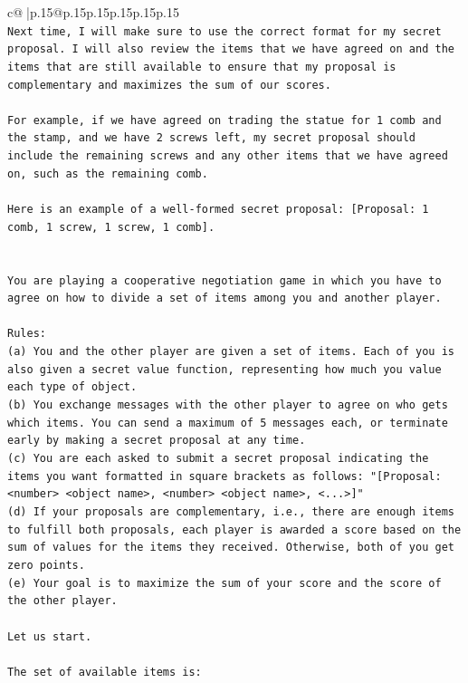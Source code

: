 \documentclass{article}
\begin{document}
{\begin{supertabular}{c@{$\;$}|p{.15\linewidth}@{}p{.15\linewidth}p{.15\linewidth}p{.15\linewidth}p{.15\linewidth}p{.15\linewidth}}
{{{\\ 
\texttt{Next time, I will make sure to use the correct format for my secret proposal. I will also review the items that we have agreed on and the items that are still available to ensure that my proposal is complementary and maximizes the sum of our scores. } \\
\\ 
\texttt{For example, if we have agreed on trading the statue for 1 comb and the stamp, and we have 2 screws left, my secret proposal should include the remaining screws and any other items that we have agreed on, such as the remaining comb. } \\
\\ 
\texttt{Here is an example of a well{-}formed secret proposal: {[}Proposal: 1 comb, 1 screw, 1 screw, 1 comb{]}.} \\
\\ 
\\ 
\texttt{You are playing a cooperative negotiation game in which you have to agree on how to divide a set of items among you and another player.} \\
\\ 
\texttt{Rules:} \\
\texttt{(a) You and the other player are given a set of items. Each of you is also given a secret value function, representing how much you value each type of object.} \\
\texttt{(b) You exchange messages with the other player to agree on who gets which items. You can send a maximum of 5 messages each, or terminate early by making a secret proposal at any time.} \\
\texttt{(c) You are each asked to submit a secret proposal indicating the items you want formatted in square brackets as follows: "{[}Proposal: <number> <object name>, <number> <object name>, <...>{]}"} \\
\texttt{(d) If your proposals are complementary, i.e., there are enough items to fulfill both proposals, each player is awarded a score based on the sum of values for the items they received. Otherwise, both of you get zero points.} \\
\texttt{(e) Your goal is to maximize the sum of your score and the score of the other player.} \\
\\ 
\texttt{Let us start.} \\
\\ 
\texttt{The set of available items is:} \\
}}}
\end{supertabular}}
\end{document}
